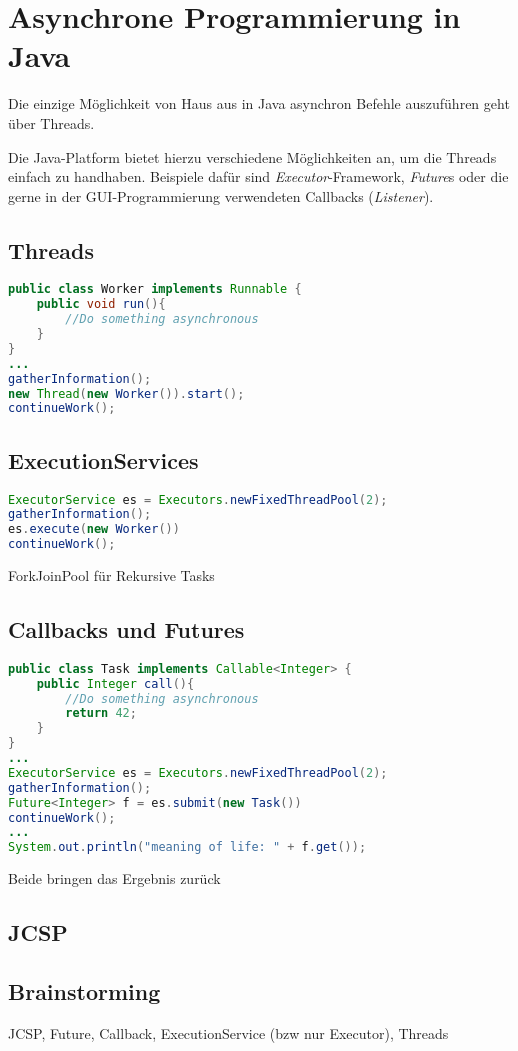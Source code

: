 \section{Asynchrone Programmierung in Java}
Die einzige Möglichkeit von Haus aus in Java asynchron Befehle auszuführen geht über Threads.

Die Java-Platform bietet hierzu verschiedene Möglichkeiten an, um die Threads einfach zu handhaben. Beispiele dafür sind \textit{Executor}-Framework, \textit{Future}s oder die gerne in der \acs{GUI}-Programmierung verwendeten Callbacks (\textit{Listener}).

\subsection{Threads}

\begin{lstlisting}[language=Java,caption=Definition und Erzeugung eines Threads,label=lst:java_thread]
public class Worker implements Runnable {
	public void run(){
		//Do something asynchronous 	
	}
}
...
gatherInformation();
new Thread(new Worker()).start(); 
continueWork();
\end{lstlisting}


\subsection{ExecutionServices}

\begin{lstlisting}[language=Java,caption=Verwendung eines ExecutionServices,label=lst:java_executionservice]
ExecutorService es = Executors.newFixedThreadPool(2);
gatherInformation();
es.execute(new Worker())
continueWork();
\end{lstlisting}

ForkJoinPool für Rekursive Tasks

\subsection{Callbacks und Futures}
\begin{lstlisting}[language=Java,caption=Verwendung von Futures,label=lst:java_futures]
public class Task implements Callable<Integer> {
	public Integer call(){
		//Do something asynchronous
		return 42; 	
	}
}
...
ExecutorService es = Executors.newFixedThreadPool(2);
gatherInformation();
Future<Integer> f = es.submit(new Task())
continueWork();
...
System.out.println("meaning of life: " + f.get());


\end{lstlisting}
Beide bringen das Ergebnis zurück


\subsection{JCSP}

\subsection{Brainstorming}
JCSP, Future, Callback, ExecutionService (bzw nur Executor), Threads
